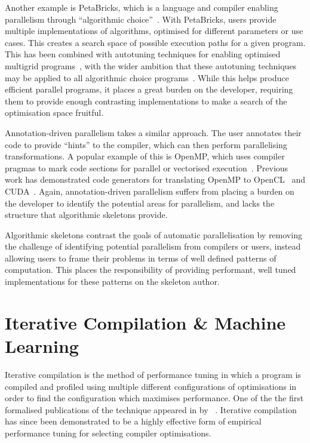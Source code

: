 Another example is PetaBricks, which is a language and compiler
enabling parallelism through ``algorithmic choice''~\cite{Ansel2009,
	Ansel2010}. With PetaBricks, users provide multiple implementations
of algorithms, optimised for different parameters or use cases. This
creates a search space of possible execution paths for a given
program. This has been combined with autotuning techniques for
enabling optimised multigrid programs~\cite{Chan2009}, with the wider
ambition that these autotuning techniques may be applied to all
algorithmic choice programs~\cite{Ansel2014}. While this helps produce
efficient parallel programs, it places a great burden on the
developer, requiring them to provide enough contrasting
implementations to make a search of the optimisation space fruitful.

Annotation-driven parallelism takes a similar approach. The user
annotates their code to provide ``hints'' to the compiler, which can
then perform parallelising transformations. A popular example of this
is OpenMP, which uses compiler pragmas to mark code sections for
parallel or vectorised execution~\cite{Dagum1998}. Previous work has
demonstrated code generators for translating OpenMP to
OpenCL~\cite{Grewe2013} and CUDA~\cite{Lee2009}. Again,
annotation-driven parallelism suffers from placing a burden on the
developer to identify the potential areas for parallelism, and lacks
the structure that algorithmic skeletons provide.

Algorithmic skeletons contrast the goals of automatic parallelisation
by removing the challenge of identifying potential parallelism from
compilers or users, instead allowing users to frame their problems in
terms of well defined patterns of computation. This places the
responsibility of providing performant, well tuned implementations for
these patterns on the skeleton author.


\section{Iterative Compilation \& Machine Learning}\label{sec:iterative-compilation}

Iterative compilation is the method of performance tuning in which a
program is compiled and profiled using multiple different
configurations of optimisations in order to find the configuration
which maximises performance. One of the the first formalised
publications of the technique appeared in \citeyear{Bodin1998} by
\citeauthor{Bodin1998}~\cite{Bodin1998}.  Iterative compilation has
since been demonstrated to be a highly effective form of empirical
performance tuning for selecting compiler optimisations.

